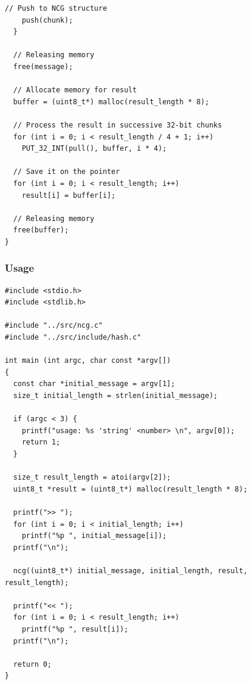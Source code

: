 \documentclass[twocolumn, a4paper, 10pt]{article}
\begin{document}
\begin{lstlisting}[style=codeAppendix]
    // Push to NCG structure
    push(chunk);
  }

  // Releasing memory
  free(message);

  // Allocate memory for result
  buffer = (uint8_t*) malloc(result_length * 8);

  // Process the result in successive 32-bit chunks
  for (int i = 0; i < result_length / 4 + 1; i++)
    PUT_32_INT(pull(), buffer, i * 4);

  // Save it on the pointer
  for (int i = 0; i < result_length; i++)
    result[i] = buffer[i];

  // Releasing memory
  free(buffer);
}
\end{lstlisting}

\subsubsection{Usage}

\begin{lstlisting}[style=codeAppendix]
#include <stdio.h>
#include <stdlib.h>

#include "../src/ncg.c"
#include "../src/include/hash.c"

int main (int argc, char const *argv[])
{
  const char *initial_message = argv[1];
  size_t initial_length = strlen(initial_message);

  if (argc < 3) {
    printf("usage: %s 'string' <number> \n", argv[0]);
    return 1;
  }

  size_t result_length = atoi(argv[2]);
  uint8_t *result = (uint8_t*) malloc(result_length * 8);

  printf(">> ");
  for (int i = 0; i < initial_length; i++)
    printf("%p ", initial_message[i]);
  printf("\n");

  ncg((uint8_t*) initial_message, initial_length, result, result_length);

  printf("<< ");
  for (int i = 0; i < result_length; i++)
    printf("%p ", result[i]);
  printf("\n");

  return 0;
}
\end{lstlisting}


\clearpage
\onecolumn

\printbibliography[title={References}]

\end{document}
